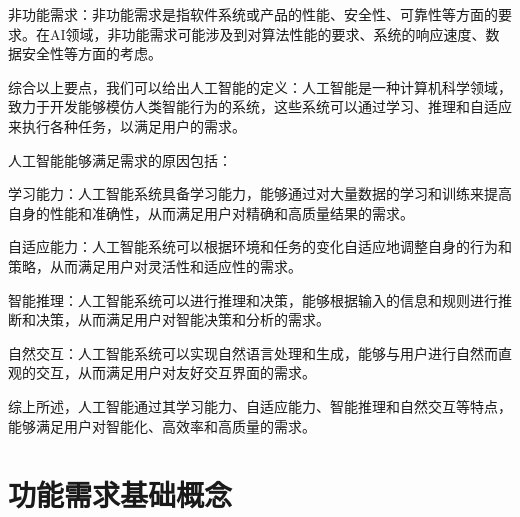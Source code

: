 \documentclass[11pt, a4paper, oneside]{ctexbook}
\begin{document}
非功能需求：非功能需求是指软件系统或产品的性能、安全性、可靠性等方面的要求。在AI领域，非功能需求可能涉及到对算法性能的要求、系统的响应速度、数据安全性等方面的考虑。

综合以上要点，我们可以给出人工智能的定义：人工智能是一种计算机科学领域，致力于开发能够模仿人类智能行为的系统，这些系统可以通过学习、推理和自适应来执行各种任务，以满足用户的需求。

人工智能能够满足需求的原因包括：

学习能力：人工智能系统具备学习能力，能够通过对大量数据的学习和训练来提高自身的性能和准确性，从而满足用户对精确和高质量结果的需求。

自适应能力：人工智能系统可以根据环境和任务的变化自适应地调整自身的行为和策略，从而满足用户对灵活性和适应性的需求。

智能推理：人工智能系统可以进行推理和决策，能够根据输入的信息和规则进行推断和决策，从而满足用户对智能决策和分析的需求。

自然交互：人工智能系统可以实现自然语言处理和生成，能够与用户进行自然而直观的交互，从而满足用户对友好交互界面的需求。

综上所述，人工智能通过其学习能力、自适应能力、智能推理和自然交互等特点，能够满足用户对智能化、高效率和高质量的需求。

\chapter{功能需求基础概念}
\end{document}
